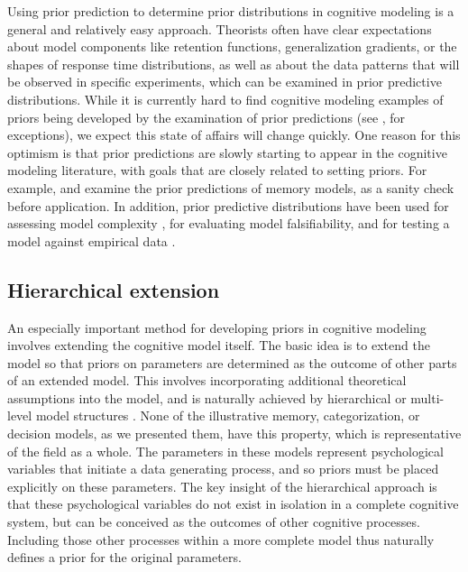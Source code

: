Using prior prediction to determine prior distributions in cognitive modeling is a general and relatively easy approach. Theorists often have clear expectations about model components like retention functions, generalization gradients, or the shapes of response time distributions, as well as about the data patterns that will be observed in specific experiments, which can be examined in prior predictive distributions. While it is currently hard to find cognitive modeling examples of priors being developed by the examination of prior predictions (see , for exceptions), we expect this state of affairs will change quickly. One reason for this optimism is that prior predictions are slowly starting to appear in the cognitive modeling literature, with goals that are closely related to setting priors. For example,  and  examine the prior predictions of memory models, as a sanity check before application. In addition, prior predictive distributions have been used for assessing model complexity \cite{Vanpaemel2009}, for evaluating model falsifiability, and for testing a model against empirical data \cite{Vanpaemel2016b}. 

\subsection{Hierarchical extension}

An especially important method for developing priors in cognitive modeling involves extending the cognitive model itself. The basic idea is to extend the model so that priors on parameters are determined as the outcome of other parts of an extended model. This involves incorporating additional theoretical assumptions into the model, and is naturally achieved by hierarchical or multi-level model structures \cite{Lee2011,Vanpaemel2011}. None of the illustrative memory, categorization, or decision models, as we presented them, have this property, which is representative of the field as a whole. The parameters in these models represent psychological variables that initiate a data generating process, and so priors must be placed explicitly on these parameters. The key insight of the hierarchical approach is that these psychological variables do not exist in isolation in a complete cognitive system, but can be conceived as the outcomes of other cognitive processes. Including those other processes within a more complete model thus naturally defines a prior for the original parameters.

